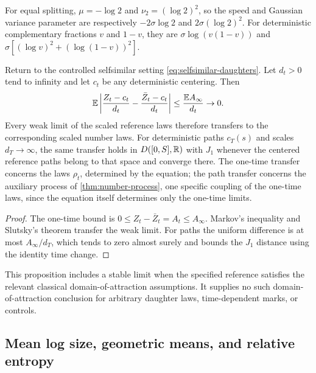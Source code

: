 For equal splitting, $\mu=-\log2$ and $\nu_2=(\log2)^2$, so the
speed and Gaussian variance parameter are respectively
$-2\sigma\log2$ and $2\sigma(\log2)^2$. For deterministic
complementary fractions $v$ and $1-v$, they are
$\sigma\log(v(1-v))$ and
$\sigma[(\log v)^2+(\log(1-v))^2]$.

\begin{proposition}
\label{prop:general-scale-transfer}
Return to the controlled selfsimilar setting
\eqref{eq:selfsimilar-daughters}. Let $d_t>0$ tend to infinity and
let $c_t$ be any deterministic centering. Then
\begin{equation}
 \mathbb E\left|\frac{Z_t-c_t}{d_t}-\frac{\bar Z_t-c_t}{d_t}\right|
 \leq\frac{\mathbb E A_\infty}{d_t}\to0.
 \label{eq:general-scale-transfer}
\end{equation}
Every weak limit of the scaled reference laws therefore transfers to
the corresponding scaled number laws. For deterministic paths
$c_T(s)$ and scales $d_T\to\infty$, the same transfer holds in
$D([0,S],\mathbb R)$ with $J_1$ whenever the centered reference paths
belong to that space and converge there.
The one-time transfer concerns the laws $\rho_t$, determined by the
equation; the path transfer concerns the auxiliary process of
\cref{thm:number-process}, one specific coupling of the one-time
laws, since the equation itself determines only the one-time limits.
\end{proposition}

\begin{proof}
The one-time bound is $0\leq Z_t-\bar Z_t=A_t\leq A_\infty$.
Markov's inequality and Slutsky's theorem transfer the weak limit.
For paths the uniform difference is at most $A_\infty/d_T$, which
tends to zero almost surely and bounds the $J_1$ distance using the
identity time change.
\end{proof}

This proposition includes a stable limit when the specified reference
satisfies the relevant classical domain-of-attraction assumptions.
It supplies no such domain-of-attraction conclusion for arbitrary
daughter laws, time-dependent marks, or controls.

\subsection{Mean log size, geometric means, and relative entropy}

